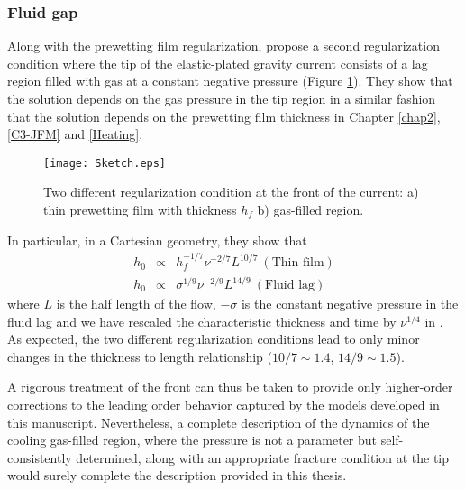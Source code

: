 \subsubsection*{Fluid gap}
\label{sec:fluid-gap}

Along      with      the     prewetting      film      regularization,
\citet{Anonymous:QWXp_4JV} propose  a second  regularization condition
where the tip of the elastic-plated  gravity current consists of a lag
region  filled  with  gas  at a  constant  negative  pressure  (Figure
\ref{C7-Sketch}).   They show  that the  solution depends  on the  gas
pressure in  the tip  region in  a similar  fashion that  the solution
depends  on  the prewetting  film  thickness  in Chapter  \ref{chap2},
\ref{C3-JFM} and \ref{Heating}.
\begin{figure}[h!]
 \begin{center}
 \graphicspath{ {/Users/thorey/Documents/These/Manuscript/Figure/Chapter7/} }
 \texttt{[image: Sketch.eps]}
 \caption{Two different  regularization condition at the  front of the
   current: a) thin prewetting film with thickness $h_f$ b) gas-filled
   region.}
 \label{C7-Sketch}
 \end{center}
\end{figure}
In particular, in a Cartesian geometry, they show that
\begin{eqnarray}
 h_0&\propto& h_f^{-1/7}\nu^{-2/7}L^{10/7}~(\text{Thin film})\\
 h_0&\propto& \sigma^{1/9}\nu^{-2/9}L^{14/9}~(\text{Fluid lag})
\end{eqnarray}
where $L$  is the half length  of the flow, $-\sigma$  is the constant
negative  pressure  in  the  fluid   lag  and  we  have  rescaled  the
characteristic    thickness    and     time    by    $\nu^{1/4}$    in
\citet{Anonymous:QWXp_4JV}.   As    expected,   the    two   different
regularization conditions lead  to only minor changes  in the thickness
to length relationship ($10/7\sim 1.4$, $14/9\sim 1.5 $).

A rigorous  treatment of the front  can thus be taken  to provide only
higher-order corrections to the leading order behavior captured by the
models  developed   in  this  manuscript.  Nevertheless,   a  complete
description of  the dynamics of  the cooling gas-filled  region, where
the  pressure is  not  a parameter  but self-consistently  determined,
along with an  appropriate fracture condition at the  tip would surely
complete the description provided in this thesis.


